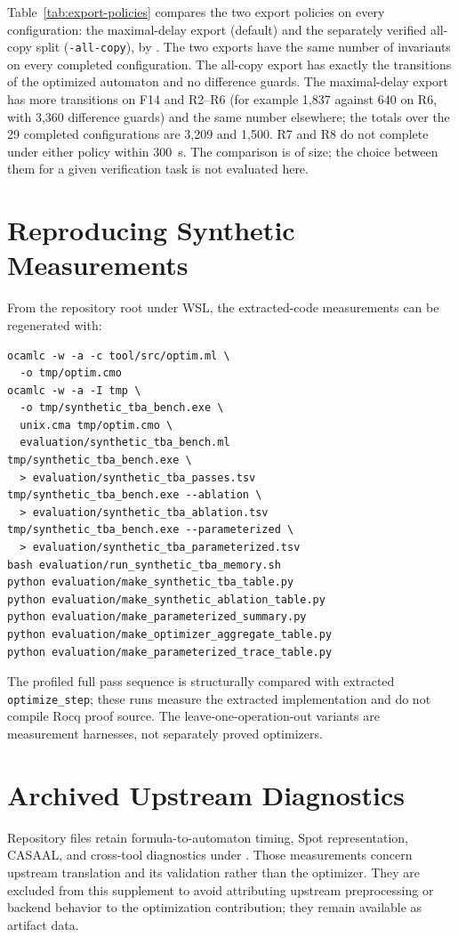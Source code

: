 \documentclass{ieeeaccess}
\begin{document}
Table~\ref{tab:export-policies} compares the two export policies on every configuration: the maximal-delay export (default) and the separately verified all-copy split (\texttt{-all-copy}), by . The two exports have the same number of invariants on every completed configuration. The all-copy export has exactly the transitions of the optimized automaton and no difference guards. The maximal-delay export has more transitions on F14 and R2--R6 (for example 1,837 against 640 on R6, with 3,360 difference guards) and the same number elsewhere; the totals over the 29 completed configurations are 3,209 and 1,500. R7 and R8 do not complete under either policy within 300~s. The comparison is of size; the choice between them for a given verification task is not evaluated here.



\section{Reproducing Synthetic Measurements}
From the repository root under WSL, the extracted-code measurements can be regenerated with:
\begingroup
\scriptsize
\begin{verbatim}
ocamlc -w -a -c tool/src/optim.ml \
  -o tmp/optim.cmo
ocamlc -w -a -I tmp \
  -o tmp/synthetic_tba_bench.exe \
  unix.cma tmp/optim.cmo \
  evaluation/synthetic_tba_bench.ml
tmp/synthetic_tba_bench.exe \
  > evaluation/synthetic_tba_passes.tsv
tmp/synthetic_tba_bench.exe --ablation \
  > evaluation/synthetic_tba_ablation.tsv
tmp/synthetic_tba_bench.exe --parameterized \
  > evaluation/synthetic_tba_parameterized.tsv
bash evaluation/run_synthetic_tba_memory.sh
python evaluation/make_synthetic_tba_table.py
python evaluation/make_synthetic_ablation_table.py
python evaluation/make_parameterized_summary.py
python evaluation/make_optimizer_aggregate_table.py
python evaluation/make_parameterized_trace_table.py
\end{verbatim}
\endgroup
The profiled full pass sequence is structurally compared with extracted \texttt{optimize\_step}; these runs measure the extracted implementation and do not compile Rocq proof source. The leave-one-operation-out variants are measurement harnesses, not separately proved optimizers.

\section{Archived Upstream Diagnostics}
Repository files retain formula-to-automaton timing, Spot representation, CASAAL, and cross-tool diagnostics under . Those measurements concern upstream translation and its validation rather than the optimizer. They are excluded from this supplement to avoid attributing upstream preprocessing or backend behavior to the optimization contribution; they remain available as artifact data.
\end{document}
